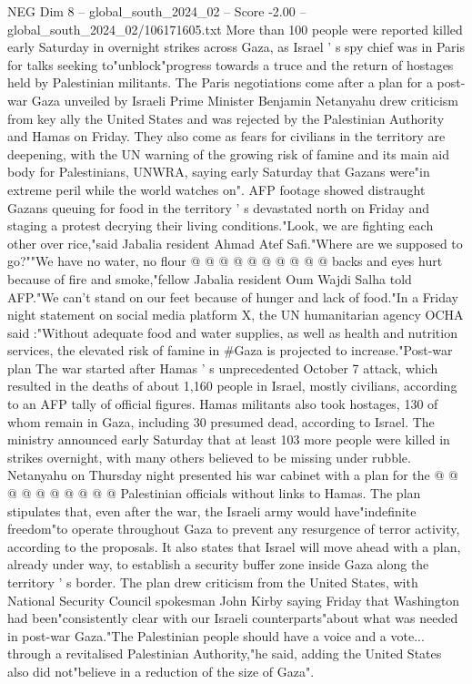 \begin{textsample}{NEG Dim 8 – global\_south\_2024\_02 – Score -2.00 – global\_south\_2024\_02/106171605.txt}  \label{ex:f8_neg_058}
More than 100 people were reported killed early Saturday in overnight strikes across Gaza, as Israel ' s spy chief was in Paris for talks seeking to"unblock"progress towards a truce and the return of hostages held by Palestinian militants.
The Paris negotiations come after a plan for a post-war Gaza unveiled by Israeli Prime Minister Benjamin Netanyahu drew criticism from key ally the United States and was rejected by the Palestinian Authority and Hamas on Friday.
They also come as fears for civilians in the territory are deepening, with the UN warning of the growing risk of famine and its main aid body for Palestinians, UNWRA, saying early Saturday that Gazans were"in extreme peril while the world watches on".
AFP footage showed distraught Gazans queuing for food in the territory ' s devastated north on Friday and staging a protest decrying their living conditions."Look, we are fighting each other over rice,"said Jabalia resident Ahmad Atef Safi."Where are we supposed to go?""We have no water, no flour @ @ @ @ @ @ @ @ @ @ backs and eyes hurt because of fire and smoke,"fellow Jabalia resident Oum Wajdi Salha told AFP."We can't stand on our feet because of hunger and lack of food."In a Friday night statement on social media platform X, the UN humanitarian agency OCHA said :"Without adequate food and water supplies, as well as health and nutrition services, the elevated risk of famine in \#Gaza is projected to increase."Post-war plan The war started after Hamas ' s unprecedented October 7 attack, which resulted in the deaths of about 1,160 people in Israel, mostly civilians, according to an AFP tally of official figures.
Hamas militants also took hostages, 130 of whom remain in Gaza, including 30 presumed dead, according to Israel.
The ministry announced early Saturday that at least 103 more people were killed in strikes overnight, with many others believed to be missing under rubble.
Netanyahu on Thursday night presented his war cabinet with a plan for the @ @ @ @ @ @ @ @ @ @ Palestinian officials without links to Hamas.
The plan stipulates that, even after the war, the Israeli army would have"indefinite freedom"to operate throughout Gaza to prevent any resurgence of terror activity, according to the proposals.
It also states that Israel will move ahead with a plan, already under way, to establish a security buffer zone inside Gaza along the territory ' s border.
The plan drew criticism from the United States, with National Security Council spokesman John Kirby saying Friday that Washington had been"consistently clear with our Israeli counterparts"about what was needed in post-war Gaza."The Palestinian people should have a voice and a vote... through a revitalised Palestinian Authority,"he said, adding the United States also did not"believe in a reduction of the size of Gaza".

\end{textsample}
